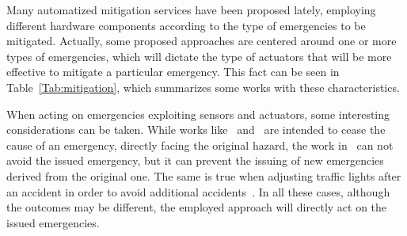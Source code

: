 \begin{refsection}
Many automatized mitigation services have been proposed lately, employing different hardware components according to the type of emergencies to be mitigated. Actually, some proposed approaches are centered around one or more types of emergencies, which will dictate the type of actuators that will be more effective to mitigate a particular emergency. This fact can be seen in Table~\ref{Tab:mitigation}, which summarizes some works with these characteristics. 

\begin{table}
  \centering
  \caption{Some IoT-based approaches to directly act on emergencies in smart cities.}\label{Tab:mitigation}
\end{table}

When acting on emergencies exploiting sensors and actuators, some interesting considerations can be taken. While works like~\cite{SultanMahmud2017} and~\cite{mitigationAct1} are intended to cease the cause of an emergency, directly facing the original hazard, the work in~\cite{iotEarthquake2} can not avoid the issued emergency, but it can prevent the issuing of new emergencies derived from the original one. The same is true when adjusting traffic lights after an accident in order to avoid additional accidents~\cite{mitigationITS1,rego2018software}. In all these cases, although the outcomes may be different, the employed approach will directly act on the issued emergencies.


\end{refsection}

